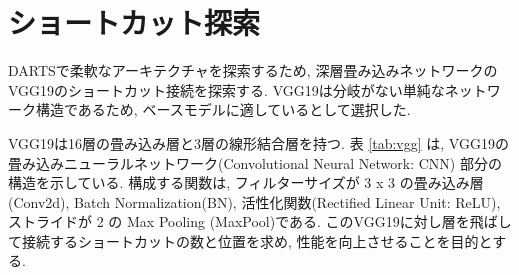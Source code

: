 \newpage
\changeindent{0cm}
\section{ショートカット探索}
\label{sec:pred}
\changeindent{2cm}

DARTSで柔軟なアーキテクチャを探索するため,
深層畳み込みネットワークのVGG19\cite{Simonyan15}のショートカット接続を探索する.
VGG19は分岐がない単純なネットワーク構造であるため, ベースモデルに適しているとして選択した.

VGG19は16層の畳み込み層と3層の線形結合層を持つ.
表 \ref{tab:vgg} は, VGG19の畳み込みニューラルネットワーク(Convolutional Neural Network: CNN) 部分の構造を示している. 構成する関数は, フィルターサイズが 3 x 3 の畳み込み層(Conv2d), Batch Normalization(BN), 活性化関数(Rectified Linear Unit: ReLU), ストライドが 2 の Max Pooling (MaxPool)である.
このVGG19に対し層を飛ばして接続するショートカットの数と位置を求め,
性能を向上させることを目的とする.

